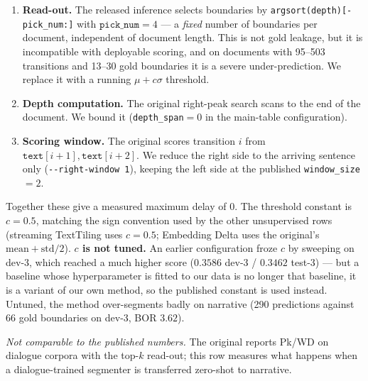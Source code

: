 \begin{enumerate}\itemsep2pt
\item \textbf{Read-out.} The released inference selects boundaries by
      \texttt{argsort(depth)[-pick\_num:]} with $\texttt{pick\_num}=4$ --- a
      \emph{fixed} number of boundaries per document, independent of document
      length. This is not gold leakage, but it is incompatible with deployable
      scoring, and on documents with 95--503 transitions and 13--30 gold
      boundaries it is a severe under-prediction. We replace it with a running
      $\mu + c\sigma$ threshold.
\item \textbf{Depth computation.} The original right-peak search scans to the
      end of the document. We bound it (\texttt{depth\_span}$=0$ in the
      main-table configuration).
\item \textbf{Scoring window.} The original scores transition $i$ from
      $\texttt{text}[i{+}1], \texttt{text}[i{+}2]$. We reduce the right side to
      the arriving sentence only (\texttt{-{}-right-window 1}), keeping the left
      side at the published \texttt{window\_size}$=2$.
\end{enumerate}

Together these give a measured maximum delay of $0$. The threshold constant is
$c=0.5$, matching the sign convention used by the other unsupervised rows
(streaming TextTiling uses $c=0.5$; Embedding Delta uses the original's
$\mathrm{mean}+\mathrm{std}/2$). \textbf{$c$ is not tuned.} An earlier
configuration froze $c$ by sweeping on dev-3, which reached a much higher score
($0.3586$ dev-3 / $0.3462$ test-3) --- but a baseline whose hyperparameter is
fitted to our data is no longer that baseline, it is a variant of our own
method, so the published constant is used instead. Untuned, the method
over-segments badly on narrative (290 predictions against 66 gold boundaries on
dev-3, BOR $3.62$).

\emph{Not comparable to the published numbers.} The original reports Pk/WD on
dialogue corpora with the top-$k$ read-out; this row measures what happens when
a dialogue-trained segmenter is transferred zero-shot to narrative.

